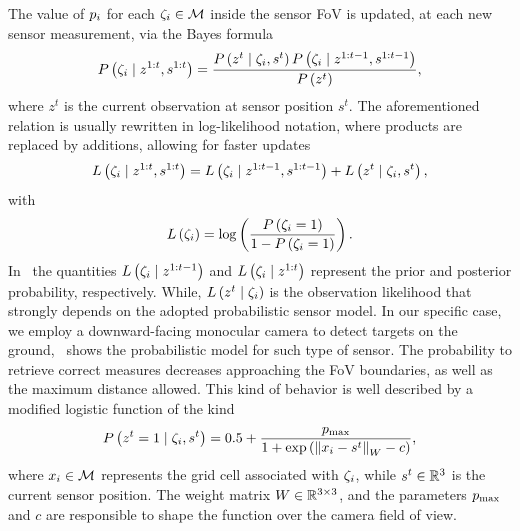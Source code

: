 The value of $p_i$ for each $\zeta_i \in \mathcal{M}$ inside the sensor FoV is updated, at each new sensor measurement,
via the Bayes formula
\begin{equation*}
	P \left( \zeta_i \mid z^{1:t}, s^{1:t} \right) = \frac{P \left( z^{t} \mid \zeta_i, s^t \right)
													   P \left( \zeta_i \mid z^{1:t-1}, s^{1:t-1} \right)}{P \left( z^t \right)},
\end{equation*}
where $z^t$ is the current observation at sensor position $s^t$. The aforementioned relation is usually rewritten in
log-likelihood notation, where products are replaced by additions, allowing for faster updates~\cite{hornung2013octomap}
\begin{equation}
	\label{EQ:SEARCH-LOG-LIKELIHOOD}
	L \left( \zeta_i \mid z^{1:t}, s^{1:t} \right) = L \left( \zeta_i \mid z^{1:t-1}, s^{1:t-1} \right) +
													   L \left( z^t \mid \zeta_i, s^t \right),
\end{equation}
with
\begin{equation*}
	L \left( \zeta_i \right) = \log \left( \frac{P \left( \zeta_i = 1 \right)}{1-P \left( \zeta_i = 1 \right)} \right).
\end{equation*}
In~ the quantities $L \left( \zeta_i \mid z^{1:t-1}\right)$ and
$L \left( \zeta_i \mid z^{1:t}\right)$ represent the prior and posterior probability, respectively.
While, $L \left( z^t \mid \zeta_i \right)$ is the observation likelihood that strongly depends on the adopted probabilistic
sensor model. In our specific case, we employ a downward-facing monocular camera to detect targets on the ground,~
shows the probabilistic model for such type of sensor. The probability to retrieve correct measures decreases approaching the FoV boundaries,
as well as the maximum distance allowed. This kind of behavior is well described by a modified logistic function of the kind
\begin{equation*}
	P \left( z^t = 1 \mid \zeta_i, s^t \right) = 0.5 + \frac{p_{\text{max}}}{1 + \exp \left( \left \lVert {x_i - s^t} \right \rVert_{W} - c \right)},
\end{equation*} 
where $x_i \in \mathcal{M}$ represents the grid cell associated with $\zeta_i$, while $s^t \in \mathbb{R}^3$ is the current sensor position.
The weight matrix $W \in \mathbb{R}^{3 \times 3}$, and the parameters $p_{\text{max}}$ and $c$ are responsible to shape the function
over the camera field of view.

